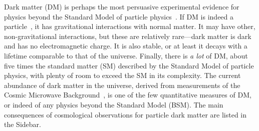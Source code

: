 





Dark matter (DM) is perhaps the most persuasive experimental evidence for physics beyond the Standard Model of particle physics~\cite{Bertone:2016nfn}. 
If DM is indeed a particle~\cite{Steigman:1979kw}, it has gravitational interactions with normal matter.
It may have other, non-gravitational interactions, but these are relatively rare---dark matter is dark and has no electromagnetic charge.
It is also stable, or at least it decays with a lifetime comparable to that of the universe.
Finally, there is {\it a lot} of DM, about five times the standard matter (SM) described by the Standard Model of particle physics, with plenty of room to exceed the SM in its complexity.
The current abundance of dark matter in the universe, derived from measurements of the Cosmic Microwave Background~\cite{Ade:2015xua}, is one of the few quantitative measures of DM, or indeed of any physics beyond the Standard Model (BSM). The main consequences of cosmological observations for particle dark matter are listed in the Sidebar. 

